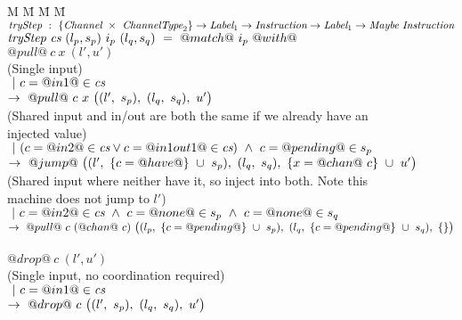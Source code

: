\newcommand\note[1]{\textcolor{notec}{(#1)}}

\begin{figure}

\begin{tabbing}
M \= M \= M \= M \kill
$\textit{tryStep} ~:~ \{\textit{Channel} ~\times~ \textit{ChannelType}_2\} \to \textit{Label}_1 \to \textit{Instruction} \to \textit{Label}_1 \to \textit{Maybe}~\textit{Instruction}$ \\
$\textit{tryStep} ~\textit{cs}~(l_p,s_p)~i_p~(l_q,s_q)~=~@match@~i_p~@with@$ \\

\> $@pull@~c~x~(l',u')$ \\
\> \> \note{Single input}\\
\> \> $~|~c=@in1@\in\textit{cs}$ \\
\> \> $\to~@pull@~c~x~
      \big((l',~s_p),~(l_q,~s_q),~u' \big)
    $ \\

\> \> \note{Shared input and in/out are both the same if we already have an injected value}\\
\> \> $~|~(c=@in2@\in\textit{cs} \vee c=@in1out1@\in\textit{cs}) ~\wedge~ c=@pending@ \in s_p$ \\
\> \> $\to~@jump@~
      \big((l',~\{ c=@have@ \}~\cup~s_p),~(l_q,~s_q),~\{ x=@chan@~c \}~\cup~u' \big)
        $ \\

\> \> \note{Shared input where neither have it, so inject into both. Note this machine does not jump to $l'$}\\
\> \> $~|~c=@in2@\in\textit{cs} ~\wedge~ c=@none@ \in s_p ~\wedge~ c=@none@ \in s_q$ \\
\> \> $\to~@pull@~c~(@chan@~c)~
      \big((l_p,~\{ c=@pending@ \}~\cup~s_p),~(l_q,~\{ c=@pending@ \}~\cup~s_q),~\{  \} \big)
  $ \\
\\

\> $@drop@~c~(l',u')$ \\
\> \> \note{Single input, no coordination required} \\
\> \> $~|~c=@in1@\in\textit{cs}$ \\
\> \> $\to~@drop@~c~
      \big((l',~s_p),~(l_q,~s_q),~u' \big)
      $ \\


\end{tabbing}
\end{figure}
